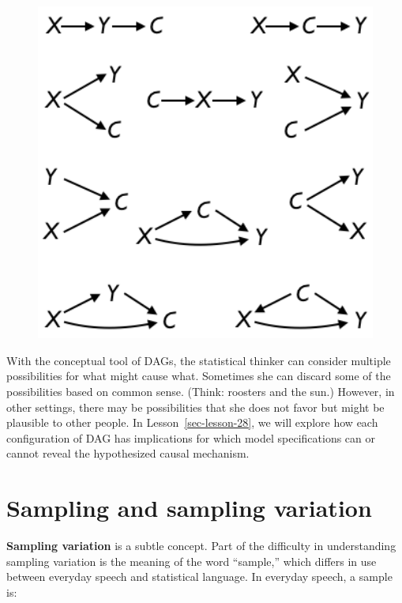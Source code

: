 \documentclass[
  letterpaper,
  DIV=11,
  numbers=noendperiod,
  oneside]{scrreprt}
\begin{document}
\begin{figure}


{\centering \includegraphics[width=1.2\textwidth,height=\textheight]{./www/ten-triples.png}

}

\end{figure}

With the conceptual tool of DAGs, the statistical thinker can consider
multiple possibilities for what might cause what. Sometimes she can
discard some of the possibilities based on common sense. (Think:
roosters and the sun.) However, in other settings, there may be
possibilities that she does not favor but might be plausible to other
people. In Lesson~\ref{sec-lesson-28}, we will explore how each
configuration of DAG has implications for which model specifications can
or cannot reveal the hypothesized causal mechanism.

\hypertarget{sec-lesson-22}{%
\chapter{Sampling and sampling variation}\label{sec-lesson-22}}

\textbf{Sampling variation} is a subtle concept. Part of the difficulty
in understanding sampling variation is the meaning of the word
``sample,'' which differs in use between everyday speech and statistical
language. In everyday speech, a sample is:
\end{document}

